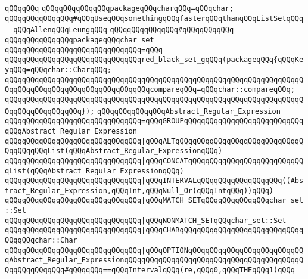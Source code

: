 \verb|qQQqqQQq|\newline
\verb|qQQqqQQqqQQqqQQqpackageqQQqcharqQQq=qQQqchar;|\newline
\newline
\newline
\newline
\verb|qQQqqQQqqQQqqQQq#qQQqUseqQQqsomethingqQQqfasterqQQqthanqQQqListSetqQQq--qQQqAllenqQQqLeungqQQq|\newline
\verb|qQQqqQQqqQQqqQQq#qQQqqQQqqQQq|\newline
\verb|qQQqqQQqqQQqqQQqpackageqQQqchar_set|\newline
\verb|qQQqqQQqqQQqqQQqqQQqqQQqqQQqqQQq=qQQq|\newline
\verb|qQQqqQQqqQQqqQQqqQQqqQQqqQQqqQQqred_black_set_gqQQq(packageqQQq{qQQqKeyqQQq=qQQqchar::CharqQQq;|\newline
\verb|qQQqqQQqqQQqqQQqqQQqqQQqqQQqqQQqqQQqqQQqqQQqqQQqqQQqqQQqqQQqqQQqqQQqqQQqqQQqqQQqqQQqqQQqqQQqqQQqqQQqqQQqcompareqQQq=qQQqchar::compareqQQq;|\newline
\verb|qQQqqQQqqQQqqQQqqQQqqQQqqQQqqQQqqQQqqQQqqQQqqQQqqQQqqQQqqQQqqQQqqQQqqQQqqQQqqQQqqQQqqQQq});|\newline
\newline
\verb|qQQqqQQqqQQqqQQqAbstract_Regular_Expression|\newline
\verb|qQQqqQQqqQQqqQQqqQQqqQQqqQQqqQQq=qQQqGROUPqQQqqQQqqQQqqQQqqQQqqQQqqQQqqQQqAbstract_Regular_Expression|\newline
\verb|qQQqqQQqqQQqqQQqqQQqqQQqqQQqqQQq|\verb#|qQQqALTqQQqqQQqqQQqqQQqqQQqqQQqqQQqqQQqqQQqqQQqList(qQQqAbstract_Regular_ExpressionqQQq)#\newline
\verb|qQQqqQQqqQQqqQQqqQQqqQQqqQQqqQQq|\verb#|qQQqCONCATqQQqqQQqqQQqqQQqqQQqqQQqqQQqList(qQQqAbstract_Regular_ExpressionqQQq)#\newline
\verb|qQQqqQQqqQQqqQQqqQQqqQQqqQQqqQQq|\verb#|qQQqINTERVALqQQqqQQqqQQqqQQqqQQq((Abstract_Regular_Expression,qQQqInt,qQQqNull_Or(qQQqIntqQQq))qQQq)#\newline
\verb|qQQqqQQqqQQqqQQqqQQqqQQqqQQqqQQq|\verb#|qQQqMATCH_SETqQQqqQQqqQQqqQQqchar_set::Set#\newline
\verb|qQQqqQQqqQQqqQQqqQQqqQQqqQQqqQQq|\verb#|qQQqNONMATCH_SETqQQqchar_set::Set#\newline
\verb|qQQqqQQqqQQqqQQqqQQqqQQqqQQqqQQq|\verb#|qQQqCHARqQQqqQQqqQQqqQQqqQQqqQQqqQQqqQQqqQQqchar::Char#\newline
\verb|qQQqqQQqqQQqqQQqqQQqqQQqqQQqqQQq|\verb#|qQQqOPTIONqQQqqQQqqQQqqQQqqQQqqQQqqQQqAbstract_Regular_ExpressionqQQqqQQqqQQqqQQqqQQqqQQqqQQqqQQqqQQqqQQqqQQqqQQqqQQqqQQq#\verb|#qQQqqQQq==qQQqIntervalqQQq(re,qQQq0,qQQqTHEqQQq1)qQQq|\newline
